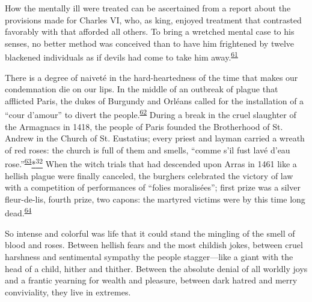 How the mentally ill were treated can be ascertained from a report about
the provisions made for Charles VI, who, as king, enjoyed treatment that
contrasted favorably with that afforded all others. To bring a wretched
mental case to his senses, no better method was conceived than to have
him frightened by twelve blackened individuals as if devils had come to
take him
away.\textsuperscript{\protect\hypertarget{08_Chapter_One__THE_PASSIONATE_INTE.xhtmlux5cux23id_2109}{\protect\hyperlink{23_NOTES.xhtmlux5cux23id_2110}{61}}}

\protect\hypertarget{08_Chapter_One__THE_PASSIONATE_INTE.xhtmlux5cux23page_24}{}{}There
is a degree of naiveté in the hard-heartedness of the time that makes
our condemnation die on our lips. In the middle of an outbreak of plague
that afflicted Paris, the dukes of Burgundy and Orléans called for the
installation of a ``cour d'amour'' to divert the
people.\textsuperscript{\protect\hypertarget{08_Chapter_One__THE_PASSIONATE_INTE.xhtmlux5cux23id_2107}{\protect\hyperlink{23_NOTES.xhtmlux5cux23id_2108}{62}}}
During a break in the cruel slaughter of the Armagnacs in 1418, the
people of Paris founded the Brotherhood of St. Andrew in the Church of
St. Eustatius; every priest and layman carried a wreath of red roses:
the church is full of them and smells, ``comme s'il fust lavé d'eau
rose.''\textsuperscript{\protect\hypertarget{08_Chapter_One__THE_PASSIONATE_INTE.xhtmlux5cux23id_2105}{\protect\hyperlink{23_NOTES.xhtmlux5cux23id_2106}{63}}}\protect\hypertarget{08_Chapter_One__THE_PASSIONATE_INTE.xhtmlux5cux23id_2397}{\protect\hyperlink{23_NOTES.xhtmlux5cux23id_2398}{*\textsuperscript{32}}}
When the witch trials that had descended upon Arras in 1461 like a
hellish plague were finally canceled, the burghers celebrated the
victory of law with a competition of performances of ``folies
moralisées''; first prize was a silver fleur-de-lis, fourth prize, two
capons: the martyred victims were by this time long
dead.\textsuperscript{\protect\hypertarget{08_Chapter_One__THE_PASSIONATE_INTE.xhtmlux5cux23id_2103}{\protect\hyperlink{23_NOTES.xhtmlux5cux23id_2104}{64}}}

So intense and colorful was life that it could stand the mingling of the
smell of blood and roses. Between hellish fears and the most childish
jokes, between cruel harshness and sentimental sympathy the people
stagger---like a giant with the head of a child, hither and thither.
Between the absolute denial of all worldly joys and a frantic yearning
for wealth and pleasure, between dark hatred and merry conviviality,
they live in extremes.

